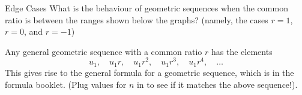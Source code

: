 \documentclass[../../main.tex]{subfiles}
\begin{document}
\begin{figure}[h]
    \centering
    \begin{subfigure}{0.49\textwidth}
    \end{subfigure}
    \begin{subfigure}{0.49\textwidth}
    \end{subfigure}
\end{figure}

\begin{thinking}{Edge Cases}
    What is the behaviour of geometric sequences when the common ratio is between the ranges shown below the graphs? (namely, the cases \(r = 1\), \(r = 0\), and \(r = -1\))
\end{thinking}

Any general geometric sequence with a common ratio \(r\) has the elements
\[
    u_1,\quad u_1r,\quad u_1r^2,\quad u_1r^3,\quad u_1r^4,\quad \ldots
\]
This gives rise to the general formula for a geometric sequence, which is in the formula booklet. (Plug values for \(n\) in to see if it matches the above sequence!).

\end{document}
